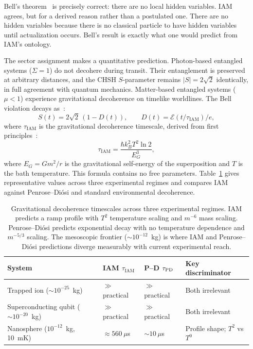 \documentclass[12pt,a4paper]{article}
\begin{document}
Bell's theorem~\citep{Bell1964} is precisely correct: there are no local
hidden variables. IAM agrees, but for a derived reason rather than a
postulated one. There are no hidden variables because there is no
classical particle to have hidden variables until actualization occurs.
Bell's result is exactly what one would predict from IAM's ontology.

The sector assignment makes a quantitative prediction. Photon-based
entangled systems ($\Sigma = 1$) do not decohere during transit. Their
entanglement is preserved at arbitrary distances, and the CHSH
$S$-parameter remains $|S| = 2\sqrt{2}$ identically, in full agreement
with quantum mechanics. Matter-based entangled systems ($\mu < 1$)
experience gravitational decoherence on timelike worldlines. The Bell
violation decays as~\citep{IAM_QM}:
\begin{equation}
S(t) = 2\sqrt{2}\,(1 - D(t)), \qquad
D(t) = \mathcal{E}(t/\tau_{\mathrm{IAM}})/e,
\label{eq:bell}
\end{equation}
where $\tau_{\mathrm{IAM}}$ is the gravitational decoherence timescale,
derived from first principles~\citep{IAM_grav}:
\begin{equation}
\tau_{\mathrm{IAM}} = \frac{\hbar k_B^2 T^2 \ln 2}{E_G^3},
\label{eq:tauIAM}
\end{equation}
where $E_G = Gm^2/r$ is the gravitational self-energy of the
superposition and $T$ is the bath temperature. This formula contains
no free parameters. Table~\ref{tab:decoherence} gives representative
values across three experimental regimes and compares IAM against
Penrose--Di\'{o}si and standard environmental decoherence.

\begin{table}[h]
\centering
\small
\caption{Gravitational decoherence timescales across three experimental
regimes. IAM predicts a ramp profile with $T^2$ temperature scaling and
$m^{-6}$ mass scaling. Penrose--Di\'{o}si predicts exponential decay
with no temperature dependence and $m^{-5/3}$ scaling. The mesoscopic
frontier ($\sim 10^{-12}$~kg) is where IAM and Penrose--Di\'{o}si
predictions diverge measurably with current experimental reach.}
\label{tab:decoherence}
\begin{tabular}{p{4.2cm}p{2.8cm}p{2.8cm}p{3.6cm}}
\toprule
\textbf{System} & \textbf{IAM $\tau_{\mathrm{IAM}}$} &
\textbf{P--D $\tau_{\rm PD}$} & \textbf{Key discriminator} \\
\midrule
Trapped ion ($\sim 10^{-25}$~kg) &
  $\gg$ practical & $\gg$ practical & Both irrelevant \\
Superconducting qubit ($\sim 10^{-20}$~kg) &
  $\gg$ practical & $\gg$ practical & Both irrelevant \\
Nanosphere ($10^{-12}$~kg, 10~mK) &
  $\approx 560~\mu$s & $\sim 10~\mu$s &
  Profile shape; $T^2$ vs $T^0$ \\
\bottomrule
\end{tabular}
\end{table}
\end{document}

